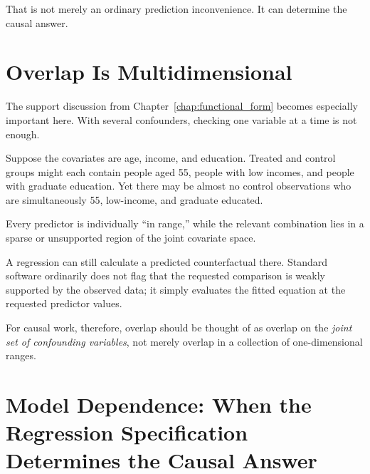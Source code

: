 \documentclass[11pt]{report}
\begin{document}
That is not merely an ordinary prediction inconvenience. It can determine the causal answer.

\begin{center}
\end{center}

\section{Overlap Is Multidimensional}

The support discussion from Chapter~\ref{chap:functional_form} becomes especially important here. With several confounders, checking one variable at a time is not enough.

Suppose the covariates are age, income, and education. Treated and control groups might each contain people aged 55, people with low incomes, and people with graduate education. Yet there may be almost no control observations who are simultaneously 55, low-income, and graduate educated.

Every predictor is individually ``in range,'' while the relevant combination lies in a sparse or unsupported region of the joint covariate space.

A regression can still calculate a predicted counterfactual there. Standard software ordinarily does not flag that the requested comparison is weakly supported by the observed data; it simply evaluates the fitted equation at the requested predictor values.

For causal work, therefore, overlap should be thought of as overlap on the \emph{joint set of confounding variables}, not merely overlap in a collection of one-dimensional ranges.

\section{Model Dependence: When the Regression Specification Determines the Causal Answer}
\end{document}
